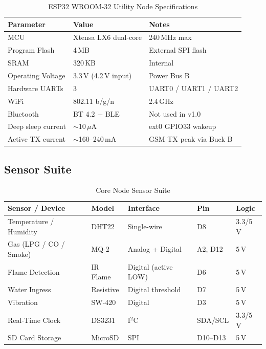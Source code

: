 \documentclass[12pt,a4paper]{article}
\begin{document}
\begin{table}[H]
\centering
\begin{tabular}{@{} L{4cm} L{4.5cm} L{4.5cm} @{}}
\toprule
\textbf{Parameter}   & \textbf{Value}         & \textbf{Notes}          \\
\midrule
MCU                  & Xtensa LX6 dual-core   & 240\,MHz max            \\
Program Flash        & 4\,MB                  & External SPI flash      \\
SRAM                 & 320\,KB                & Internal                \\
Operating Voltage    & 3.3\,V (4.2\,V input)  & Power Bus B             \\
Hardware UARTs       & 3                      & UART0 / UART1 / UART2   \\
WiFi                 & 802.11 b/g/n           & 2.4\,GHz                \\
Bluetooth            & BT 4.2 + BLE           & Not used in v1.0        \\
Deep sleep current   & $\sim$10\,$\mu$A       & ext0 GPIO33 wakeup      \\
Active TX current    & $\sim$160--240\,mA     & GSM TX peak via Buck B  \\
\bottomrule
\end{tabular}
\caption{ESP32 WROOM-32 Utility Node Specifications}
\end{table}

\subsection{Sensor Suite}

\begin{table}[H]
\centering
\begin{tabular}{@{} L{4.2cm} L{2.2cm} L{2.8cm} L{2cm} L{2cm} @{}}
\toprule
\textbf{Sensor / Device} & \textbf{Model} & \textbf{Interface} & \textbf{Pin} & \textbf{Logic} \\
\midrule
Temperature / Humidity   & DHT22   & Single-wire         & D8       & 3.3/5\,V \\
Gas (LPG / CO / Smoke)   & MQ-2    & Analog + Digital    & A2, D12  & 5\,V     \\
Flame Detection          & IR Flame& Digital (active LOW)& D6       & 5\,V     \\
Water Ingress            & Resistive& Digital threshold  & D7       & 5\,V     \\
Vibration                & SW-420  & Digital             & D3       & 5\,V     \\
Real-Time Clock          & DS3231  & I$^2$C              & SDA/SCL  & 3.3/5\,V \\
SD Card Storage          & MicroSD & SPI                 & D10--D13 & 5\,V     \\
\bottomrule
\end{tabular}
\caption{Core Node Sensor Suite}
\end{table}
\end{document}
